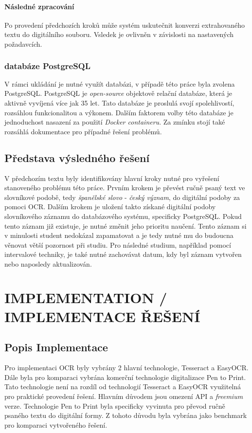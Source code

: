 \documentclass[journal]{IEEEtran}
\begin{document}
\paragraph{Následné zpracování}
Po provedení předchozích kroků může systém uskutečnit konverzi extrahovaného textu do digitálního souboru.
Vsledek je ovlivněn v závislosti na nastavených požadavcích.

\subsubsection{databáze PostgreSQL}
V rámci ukládání je nutné využít databázi, v případě této práce byla zvolena PostgreSQL.
PostgreSQL je \textit{open-source} objektově relační databáze, která je aktivně vyvíjená více jak 35 let.
Tato databáze je proslulá svojí spolehlivostí, rozsáhlou funkcionalitou a výkonem.
Dalším faktorem volby této databáze je jednoduchost nasazení za použití \textit{Docker containeru}.
Za zmínku stojí také rozsáhlá dokumentace pro případné řešení problémů.\cite{postgre}

\subsection{Představa výsledného řešení}
V předchozím textu byly identifikovány hlavní kroky nutné pro vyřešení stanoveného problému této práce.
Prvním krokem je převést ručně psaný text ve slovníkové podobě, tedy \textit{španělské slovo} - \textit{český význam}, do digitální podoby za pomoci \ac{OCR}.
Dalším krokem je uložení takto získané digitální podoby slovníkového záznamu do databázového systému, specificky PostgreSQL.
Pokud tento záznam již existuje, je nutné změnit jeho prioritu naučení.
Tento záznam si v minulosti student nedokázal zapamatovat a je tedy nutné mu do budoucna věnovat větší pozornost při studiu.
Pro následné studium, například pomocí intervalové techniky, je také nutné zachovávat datum, kdy byl záznam vytvořen nebo naposledy aktualizován.


\section{IMPLEMENTATION / IMPLEMENTACE ŘEŠENÍ}

\subsection{Popis Implementace}
Pro implementaci \ac{OCR} byly vybrány 2 hlavní technologie, Tesseract\cite{tesseract} a EasyOCR\cite{easy_ocr}.
Dále byla pro komparaci vybrána komerční technologie digitalizace Pen to Print\cite{pen_to_print}.
Tato technologie není na rozdíl od technologií Tesseract a EasyOCR využitelná pro praktické provedení řešení.
Hlavním důvodem jsou omezení \ac{API} a \textit{freemium} verze.
Technologie Pen to Print byla specificky vyvinuta pro převod ručně psaného textu do digitální formy.
Z tohoto důvodu byla vybrána jako benchmark pro komparaci vytvořeného řešení.
\end{document}
